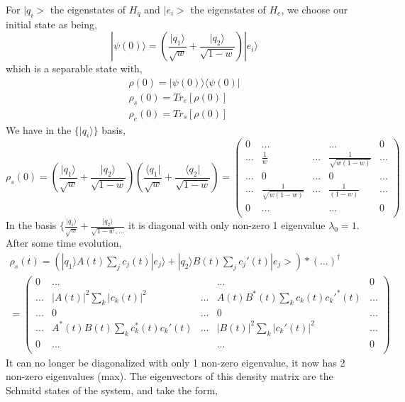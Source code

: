\documentclass{article}
\begin{document}
For $|q_i>$ the eigenstates of $H_q$ and $|e_i>$ the eigenstates of $H_e$, we choose our initial state as being,
\begin{equation}
    |\psi(0)\rangle=(\frac{|q_1\rangle}{\sqrt{w}}+\frac{|q_2\rangle}{\sqrt{1-w}})|e_i\rangle
\end{equation}
which is a separable state with,
\begin{align*}
    \rho(0)=|\psi(0)\rangle\langle \psi(0)| \\
    \rho_s(0) = Tr_e[\rho(0)] \\
    \rho_e(0)= Tr_s[\rho(0)]
\end{align*}
We have in the $\{|q_i\rangle\}$ basis,
\begin{equation}
    \rho_s(0) = (\frac{|q_1\rangle}{\sqrt{w}}+\frac{|q_2\rangle}{\sqrt{1-w}})(\frac{\langle q_1|}{\sqrt{w}}+\frac{\langle q_2|}{\sqrt{1-w}}) = 
    \begin{pmatrix}
        0 & ... & & ... & 0 \\
        ... & \frac{1}{w} & ... & \frac{1}{\sqrt{w(1-w)}} & ... \\
        ... & 0 & ... & 0 & ... \\
        ... & \frac{1}{\sqrt{w(1-w)}} & ... & \frac{1}{(1-w)} & ... \\
        0 & ... & & ... & 0 \\
    \end{pmatrix}
\end{equation}
In the basis $\{\frac{|q_1\rangle}{\sqrt{w}}+\frac{|q_2\rangle}{\sqrt{1-w},...}$ it is diagonal with only non-zero 1 eigenvalue $\lambda_0=1$.
After some time evolution,
\begin{align*}
    \rho_s(t) = (|q_1\rangle A(t)\sum_jc_j(t)|e_j\rangle+|q_2\rangle B(t)\sum_jc_j'(t)|e_j>)*(...)^{\dagger} \\
    =\begin{pmatrix}
        0 & ... & & ... & 0 \\
        ... & |A(t)|^2\sum_k|c_k(t)|^2 & ... & A(t)B^*(t)\sum_kc_k(t)c_k'^*(t) & ... \\
        ... & 0 & ... & 0 & ... \\
        ... & A^*(t)B(t)\sum_kc_k^*(t)c_k'(t) & ... & |B(t)|^2\sum_k|c_k'(t)|^2 & ... \\
        0 & ... & & ... & 0 \\
    \end{pmatrix}
\end{align*}
It can no longer be diagonalized with only 1 non-zero eigenvalue, it now has 2 non-zero eigenvalues (max). The eigenvectors of this density matrix are the Schmitd states of the system, and take the form,
\end{document}
